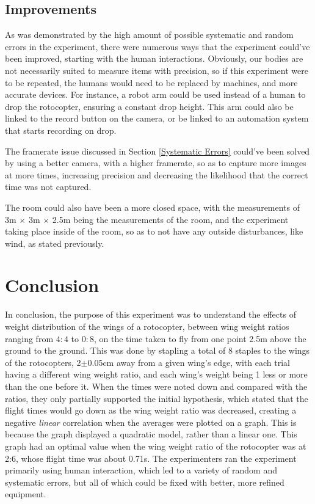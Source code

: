 \documentclass[]{article}
\theoremstyle{definition}
\begin{document}
\subsection{Improvements}
As was demonstrated by the high amount of possible systematic and random errors in the experiment, there were numerous ways that the experiment could've been improved, starting with the human interactions. Obviously, our bodies are not necessarily suited to measure items with precision, so if this experiment were to be repeated, the humans would need to be replaced by machines, and more accurate devices. For instance, a robot arm could be used instead of a human to drop the rotocopter, ensuring a constant drop height. This arm could also be linked to the record button on the camera, or be linked to an automation system that starts recording on drop.

The framerate issue discussed in Section \ref{Systematic Errors} could've been solved by using a better camera, with a higher framerate, so as to capture more images at more times, increasing precision and decreasing the likelihood that the correct time was not captured.

The room could also have been a more closed space, with the measurements of 3m $\times$ 3m $\times$ 2.5m being the measurements of the room, and the experiment taking place inside of the room, so as to not have any outside disturbances, like wind, as stated previously.

\section{Conclusion}
In conclusion, the purpose of this experiment was to understand the effects of weight distribution of the wings of a rotocopter, between wing weight ratios ranging from $4:4$ to $0:8$, on the time taken to fly from one point 2.5m above the ground to the ground. This was done by stapling a total of 8 staples to the wings of the rotocopters, 2$\pm$0.05cm away from a given wing's edge, with each trial having a different wing weight ratio, and each wing's weight being 1 less or more than the one before it. When the times were noted down and compared with the ratios, they only partially supported the initial hypothesis, which stated that the flight times would go down as the wing weight ratio was decreased, creating a negative \textit{linear} correlation when the averages were plotted on a graph. This is because the graph displayed a quadratic model, rather than a linear one. This graph had an optimal value when the wing weight ratio of the rotocopter was at 2:6, whose flight time was about 0.71s. The experimenters ran the experiment primarily using human interaction, which led to a variety of random and systematic errors, but all of which could be fixed with better, more refined equipment.
\end{document}
